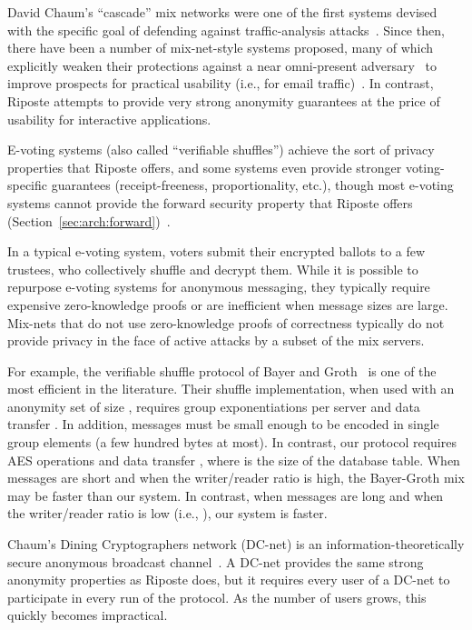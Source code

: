 \documentclass[10pt,twocolumn]{article}
\newcommand{\name}{Riposte\xspace}
\newcommand{\Name}{Riposte\xspace}
\begin{document}
David Chaum's ``cascade'' mix networks were one of the
first systems devised with the specific goal of defending
against traffic-analysis attacks~\cite{chaum1981untraceable}.
Since then, there have been a number of mix-net-style systems proposed, 
many of which explicitly weaken 
their protections against a near omni-present adversary~\cite{syverson2013why}
to improve prospects for practical usability 
(i.e., for email traffic)~\cite{danezis2003mixminion}.
In contrast, \Name attempts to provide very strong anonymity guarantees
at the price of usability for interactive applications.


E-voting systems (also called ``verifiable shuffles'')
achieve the sort of privacy properties that \name 
offers, and some systems even provide stronger 
voting-specific guarantees 
(receipt-freeness, proportionality, etc.),
though most e-voting systems cannot provide
the forward security property that \name offers (Section~\ref{sec:arch:forward})~\cite{adida2008helios,clarkson2007civitas,neff2001verifiable,groth2007verifiable,furukawa2004efficient,groth2010verifiable,rabin2014efficient}.

In a typical e-voting system, voters submit their encrypted ballots
to a few trustees, who collectively shuffle and decrypt them.
While it is possible to repurpose e-voting systems for anonymous messaging,
they typically require expensive zero-knowledge proofs 
or are inefficient when message sizes are large.
Mix-nets that do not use zero-knowledge proofs of correctness
typically do not provide privacy in the face of active attacks 
by a subset of the mix servers. 

For example, the verifiable shuffle protocol of 
Bayer and Groth~\cite{bayer2012efficient}
is one of the most efficient in the literature.
Their shuffle implementation, when used with 
an anonymity set of size , requires  group 
exponentiations per server and data
transfer .
In addition, messages must be small enough to be encoded
in single group elements (a few hundred bytes at most).
In contrast, our protocol requires  AES operations and
data transfer , where  is the size of the
database table.
When messages are short and when the writer/reader ratio
is high, the Bayer-Groth mix may be faster than our system.
In contrast, when messages are long and when the writer/reader
ratio is low (i.e., ), our system is faster.

Chaum's Dining Cryptographers network
(DC-net) is an information-theoretically secure
anonymous broadcast channel~\cite{chaum1988dining}.
A DC-net provides the same strong anonymity properties
as \name does, but it requires every user of a DC-net
to participate in every run of the protocol.
As the number of users grows, this quickly becomes impractical.
\end{document}
